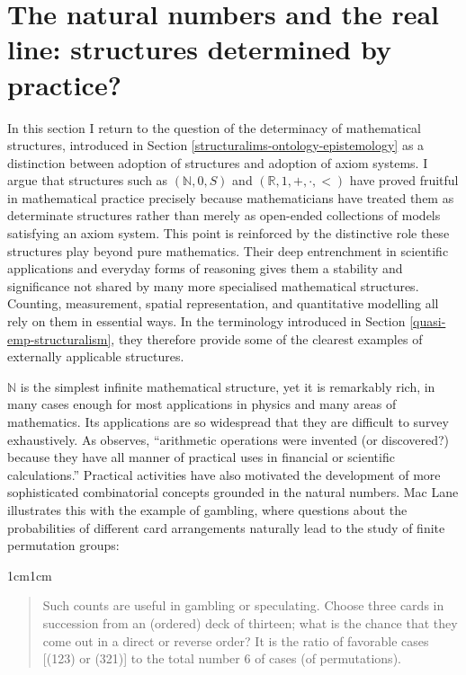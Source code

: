 \documentclass[11pt,a4paper]{book}
\theoremstyle{plain}
\begin{document}
\section{The natural numbers and the real line: structures determined by practice?}
\label{natural-reals}

In this section I return to the question of the determinacy of mathematical structures, introduced in Section \ref{structuralims-ontology-epistemology} as a distinction between adoption of structures and adoption of axiom systems. I argue that structures such as $(\mathbb{N}, 0, S)$ and $(\mathbb{R},1, +, \cdot, <)$ have proved fruitful in mathematical practice precisely because mathematicians have treated them as determinate structures rather than merely as open-ended collections of models satisfying an axiom system. This point is reinforced by the distinctive role these structures play beyond pure mathematics. Their deep entrenchment in scientific applications and everyday forms of reasoning gives them a stability and significance not shared by many more specialised mathematical structures. Counting, measurement, spatial representation, and quantitative modelling all rely on them in essential ways. In the terminology introduced in Section \ref{quasi-emp-structuralism}, they therefore provide some of the clearest examples of externally applicable structures.

$\mathbb{N}$ is the simplest infinite mathematical structure, yet it is remarkably rich, in many cases enough for most applications in physics and many areas of mathematics. Its applications are so widespread that they are difficult to survey exhaustively. As \textcite[10]{maclane1986mathematics} observes, ``arithmetic operations were invented (or discovered?) because they have all manner of practical uses in financial or scientific calculations.'' Practical activities have also motivated the development of more sophisticated combinatorial concepts grounded in the natural numbers. Mac Lane illustrates this with the example of gambling, where questions about the probabilities of different card arrangements naturally lead to the study of finite permutation groups:

\begin{adjustwidth}{1cm}{1cm}
\begin{quote}
  \small
Such counts are useful in gambling or speculating. Choose three cards in succession from an (ordered) deck of thirteen; what is the chance that they come out in a direct or reverse order? It is the ratio of favorable cases [(123) or (321)] to the total number 6 of cases (of permutations). \parencite[12]{maclane1986mathematics}
\end{quote}
\end{adjustwidth}
\end{document}
